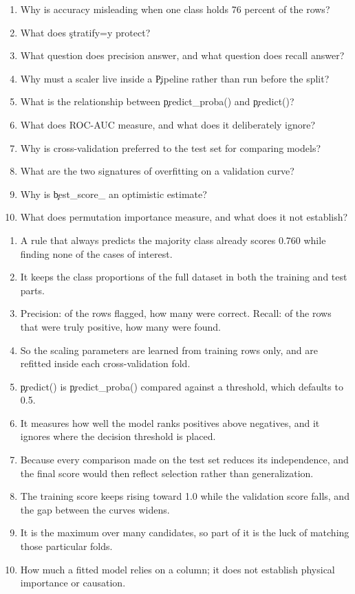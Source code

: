 \begin{enumerate}
    \item Why is accuracy misleading when one class holds 76 percent of the rows?
    \item What does \c{stratify=y} protect?
    \item What question does precision answer, and what question does recall answer?
    \item Why must a scaler live inside a \c{Pipeline} rather than run before the split?
    \item What is the relationship between \c{predict_proba()} and \c{predict()}?
    \item What does ROC-AUC measure, and what does it deliberately ignore?
    \item Why is cross-validation preferred to the test set for comparing models?
    \item What are the two signatures of overfitting on a validation curve?
    \item Why is \c{best_score_} an optimistic estimate?
    \item What does permutation importance measure, and what does it not establish?
\end{enumerate}


\begin{enumerate}
    \item A rule that always predicts the majority class already scores 0.760
          while finding none of the cases of interest.
    \item It keeps the class proportions of the full dataset in both the training
          and test parts.
    \item Precision: of the rows flagged, how many were correct. Recall: of the
          rows that were truly positive, how many were found.
    \item So the scaling parameters are learned from training rows only, and are
          refitted inside each cross-validation fold.
    \item \c{predict()} is \c{predict_proba()} compared against a threshold,
          which defaults to 0.5.
    \item It measures how well the model ranks positives above negatives, and it
          ignores where the decision threshold is placed.
    \item Because every comparison made on the test set reduces its independence,
          and the final score would then reflect selection rather than
          generalization.
    \item The training score keeps rising toward 1.0 while the validation score
          falls, and the gap between the curves widens.
    \item It is the maximum over many candidates, so part of it is the luck of
          matching those particular folds.
    \item How much a fitted model relies on a column; it does not establish
          physical importance or causation.
\end{enumerate}

